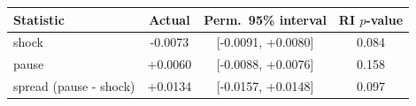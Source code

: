 \begin{tabular}{lccc}
\toprule
Statistic & Actual & Perm.\ 95\% interval & RI $p$-value \\
\midrule
shock & -0.0073 & [-0.0091, +0.0080] & 0.084 \\
pause & +0.0060 & [-0.0088, +0.0076] & 0.158 \\
spread (pause - shock) & +0.0134 & [-0.0157, +0.0148] & 0.097 \\
\bottomrule
\end{tabular}